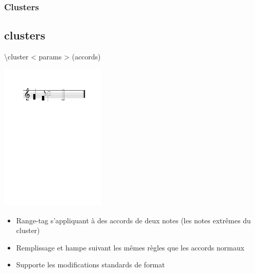 \documentclass[12pt]{beamer}
\newenvironment{code}
  {\fontfamily{prc}\selectfont}{}
\begin{document}
    \begin{frame}
    \frametitle{Clusters}
    \subsection{clusters}
    
    \begin{code} \textbackslash{}cluster \textless{} params \textgreater{} (accords) \end{code}
    
    \vspace{2mm}
    \centering  \includegraphics[width=5cm]{img/partitions/cluster.pdf}
    
    \begin{itemize}
      \item Range-tag s’appliquant \`a des accords de deux notes (les notes extr\^emes du cluster)  
      \item Remplissage et hampe suivant les mêmes règles que les accords normaux
      \item Supporte les modifications standards de format
    \end{itemize}
    
    \end{frame}
\end{document}
